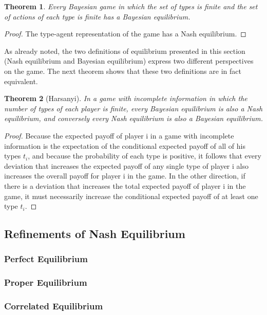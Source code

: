 \documentclass{article}
\newtheorem{Thm}{Theorem}[section]
\theoremstyle{definition}
\begin{document}
\begin{Thm}
    Every Bayesian game in which the set of types is finite and the set of actions of each type is finite has a Bayesian equilibrium.
\end{Thm}
\begin{proof}
    The type-agent representation of the game has a Nash equilibrium.
\end{proof}
As already noted, the two definitions of equilibrium presented in this section (Nash equilibrium and Bayesian equilibrium) express two different perspectives on the game.
The next theorem shows that these two definitions are in fact equivalent.
\begin{Thm}[Harsanyi]
    In a game with incomplete information in which the number of types of each player is finite, every Bayesian equilibrium is also a Nash equilibrium, and conversely every Nash equilibrium is also a Bayesian equilibrium.
\end{Thm}
\begin{proof}
    Because the expected payoff of player i in a game with incomplete information is the expectation of the conditional expected payoff of all of his types $t_i$,
    and because the probability of each type is positive, it follows that every deviation that increases the expected payoff of any single type of player i also increases the overall payoff for player i in the game.
    In the other direction, if there is a deviation that increases the total expected payoff of player i in the game, it must necessarily increase the conditional expected payoff of at least one type $t_i$.
\end{proof}


\subsection{Refinements of Nash Equilibrium}
\subsubsection{Perfect Equilibrium}

\subsubsection{Proper Equilibrium}

\subsubsection{Correlated Equilibrium}
\end{document}
